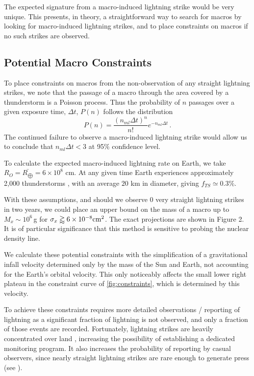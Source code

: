 \documentclass[%
 reprint,
 amsmath,amssymb,
 aps,
 nofootinbib, %
]{revtex4-2}
\begin{document}
        The expected signature from a macro-induced lightning strike would be very unique. This presents, in theory, a straightforward way to search for macros by looking for macro-induced lightning strikes, and to place constraints on macros if no such strikes are observed. 


    \subsection{Potential Macro Constraints} %
    \label{sub:macro_constraints_on_earth}

        To place constraints on macros from the non-observation of any straight lightning strikes, we note that the passage of a macro through the area covered by a thunderstorm is a Poisson process. Thus the probability of $n$ passages over a given exposure time, $\Delta t$, $P(n)$ follows the distribution
        \begin{equation}\label{eq:poisson}
            P(n) = \frac{\left({n_{ml} \Delta t}\right)^n}{n!} e^{-n_{ml} \Delta t}\,.
        \end{equation}
        The continued failure to observe a macro-induced lightning strike would allow us to conclude that $n_{ml}\Delta t<3$ at 95$\%$ confidence level.

        To calculate the expected macro-induced lightning rate on Earth, we take $R_{O} = \bar{R_{\bigoplus}} = 6 \times 10^8$ cm. At any given time Earth experiences approximately 2,000 thunderstorms \citep{NatGeo}, with an average $20$ km in diameter, giving $f_{TS}\simeq 0.3\%$.

        With these assumptions, and should we observe 0 very straight lightning strikes in two years, we could place an upper bound on the mass of a macro up to $M_x \sim 10^6\,$g for $\sigma_x\gtrapprox6\times10^{-8}{\rm cm}^2$. The exact projections are shown in Figure 2. It is of particular significance that this method is sensitive to probing the nuclear density line.
        
        We calculate these potential constraints with the simplification of a gravitational infall velocity determined only by the mass of the Sun and Earth, not accounting for the Earth's orbital velocity. This only noticeably affects the small lower right plateau in the constraint curve of \ref{fig:constraints}, which is determined by this velocity.

        To achieve these constraints requires more detailed observations / reporting of lightning as a significant fraction of lightning is not observed, and only a fraction of those events are recorded. Fortunately, lightning strikes are heavily concentrated over land \citep{Christian2003}, increasing the possibility of establishing a dedicated monitoring program. It also increases the probability of reporting by casual observers, since nearly straight lightning strikes are rare enough to generate press (see \citet{Zimbabwe}).
\end{document}
